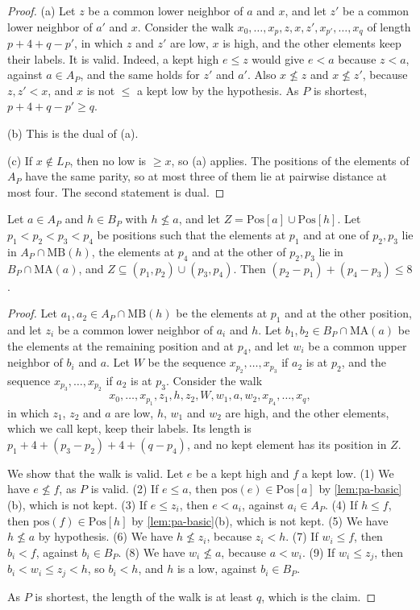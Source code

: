 \documentclass[pdflatex,sn-mathphys-num]{sn-jnl}%
\theoremstyle{thmstyleone}%
\theoremstyle{thmstyletwo}%
\theoremstyle{thmstylethree}%
\newcommand{\pos}{\mathrm{pos}}%
\newcommand{\MB}{\mathrm{MB}}%
\newcommand{\MA}{\mathrm{MA}}%
\newcommand{\Pos}{\mathrm{Pos}}%
\begin{document}
\begin{proof}
(a) Let $z$ be a common lower neighbor of $a$ and $x$, and let $z'$ be a common lower neighbor of $a'$ and $x$.
Consider the walk $x_0, \dots, x_p, z, x, z', x_{p'}, \dots, x_q$ of length $p + 4 + q - p'$, in which $z$ and $z'$ are low, $x$ is high, and the other elements keep their labels.
It is valid.
Indeed, a kept high $e \leq z$ would give $e < a$ because $z < a$, against $a \in A_P$, and the same holds for $z'$ and $a'$.
Also $x \not\leq z$ and $x \not\leq z'$, because $z, z' < x$, and $x$ is not $\leq$ a kept low by the hypothesis.
As $P$ is shortest, $p + 4 + q - p' \geq q$.

(b) This is the dual of (a).

(c) If $x \notin L_P$, then no low is $\geq x$, so (a) applies.
The positions of the elements of $A_P$ have the same parity, so at most three of them lie at pairwise distance at most four.
The second statement is dual.
\end{proof}

\begin{lemma}
\label{lem:pa-two}
Let $a \in A_P$ and $h \in B_P$ with $h \not\leq a$, and let $Z = \Pos[a] \cup \Pos[h]$.
Let $p_1 < p_2 < p_3 < p_4$ be positions such that the elements at $p_1$ and at one of $p_2, p_3$ lie in $A_P \cap \MB(h)$, the elements at $p_4$ and at the other of $p_2, p_3$ lie in $B_P \cap \MA(a)$, and $Z \subseteq (p_1, p_2) \cup (p_3, p_4)$.
Then $(p_2 - p_1) + (p_4 - p_3) \leq 8$.
\end{lemma}

\begin{proof}
Let $a_1, a_2 \in A_P \cap \MB(h)$ be the elements at $p_1$ and at the other position, and let $z_i$ be a common lower neighbor of $a_i$ and $h$.
Let $b_1, b_2 \in B_P \cap \MA(a)$ be the elements at the remaining position and at $p_4$, and let $w_i$ be a common upper neighbor of $b_i$ and $a$.
Let $W$ be the sequence $x_{p_2}, \dots, x_{p_3}$ if $a_2$ is at $p_2$, and the sequence $x_{p_3}, \dots, x_{p_2}$ if $a_2$ is at $p_3$.
Consider the walk
\[
x_0, \dots, x_{p_1}, z_1, h, z_2, W, w_1, a, w_2, x_{p_4}, \dots, x_q,
\]
in which $z_1$, $z_2$ and $a$ are low, $h$, $w_1$ and $w_2$ are high, and the other elements, which we call kept, keep their labels.
Its length is $p_1 + 4 + (p_3 - p_2) + 4 + (q - p_4)$, and no kept element has its position in $Z$.

We show that the walk is valid.
Let $e$ be a kept high and $f$ a kept low.
(1) We have $e \not\leq f$, as $P$ is valid.
(2) If $e \leq a$, then $\pos(e) \in \Pos[a]$ by \cref{lem:pa-basic}(b), which is not kept.
(3) If $e \leq z_i$, then $e < a_i$, against $a_i \in A_P$.
(4) If $h \leq f$, then $\pos(f) \in \Pos[h]$ by \cref{lem:pa-basic}(b), which is not kept.
(5) We have $h \not\leq a$ by hypothesis.
(6) We have $h \not\leq z_i$, because $z_i < h$.
(7) If $w_i \leq f$, then $b_i < f$, against $b_i \in B_P$.
(8) We have $w_i \not\leq a$, because $a < w_i$.
(9) If $w_i \leq z_j$, then $b_i < w_i \leq z_j < h$, so $b_i < h$, and $h$ is a low, against $b_i \in B_P$.

As $P$ is shortest, the length of the walk is at least $q$, which is the claim.
\end{proof}
\end{document}
